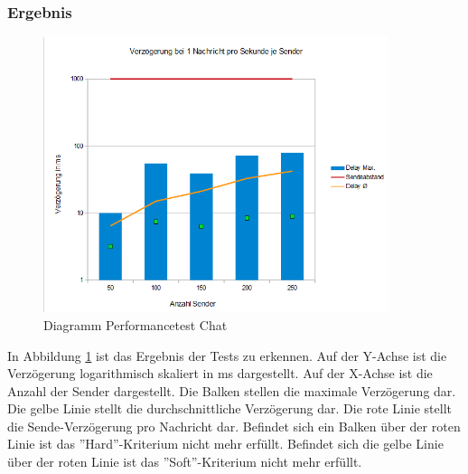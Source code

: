 \subsubsection{Ergebnis}
\begin{figure}[htH]
\centering
\includegraphics[width=0.9\textwidth]{backend/Diagramm_Performance_Chat.PNG}
\caption{Diagramm Performancetest Chat}
\label{backfig16}
\end{figure}
In Abbildung \ref{backfig16} ist das Ergebnis der Tests zu erkennen. 
Auf der Y-Achse ist die Verzögerung logarithmisch skaliert in ms dargestellt.
Auf der X-Achse ist die Anzahl der Sender dargestellt.
Die Balken stellen die maximale Verzögerung dar. 
Die gelbe Linie stellt die durchschnittliche Verzögerung dar.
Die rote Linie stellt die Sende-Verzögerung pro Nachricht dar.
Befindet sich ein Balken über der roten Linie ist das ''Hard''-Kriterium nicht mehr erfüllt.
Befindet sich die gelbe Linie über der roten Linie ist das ''Soft''-Kriterium nicht mehr erfüllt.



